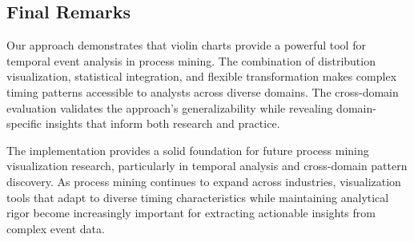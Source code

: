 \subsection{Final Remarks}
\label{subsec:remarks}

Our approach demonstrates that violin charts provide a powerful tool for temporal event analysis in process mining. The combination of distribution visualization, statistical integration, and flexible transformation makes complex timing patterns accessible to analysts across diverse domains. The cross-domain evaluation validates the approach's generalizability while revealing domain-specific insights that inform both research and practice.

The implementation provides a solid foundation for future process mining visualization research, particularly in temporal analysis and cross-domain pattern discovery. As process mining continues to expand across industries, visualization tools that adapt to diverse timing characteristics while maintaining analytical rigor become increasingly important for extracting actionable insights from complex event data.
